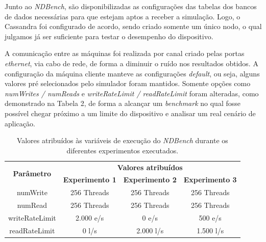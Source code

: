 \documentclass[12pt,english,brazil]{article}
\begin{document}
Junto ao \textit{NDBench}, são disponibilizadas as configurações das tabelas dos bancos de dados necessárias para que estejam aptos a receber a simulação. Logo, o Cassandra foi configurado de acordo, sendo criado somente um único nodo, o qual julgamos já ser suficiente para testar o desempenho do dispositivo.  

A comunicação entre as máquinas foi realizada por canal criado pelas portas \textit{ethernet}, via cabo de rede, de forma a diminuir o ruído nos resultados obtidos. A configuração da máquina cliente manteve as configurações \textit{default}, ou seja, alguns valores pré selecionados pelo simulador foram mantidos. Somente opções como \textit{numWrites / numReads} e \textit{writeRateLimit / readRateLimit} foram alteradas, como demonstrado na Tabela 2, de forma a alcançar um \textit{benchmark} no qual fosse possível chegar próximo a um limite do dispositivo e analisar um real cenário de aplicação.  

\begin{table}[!ht]
\centering
\caption{Valores atribuídos às variáveis de execução do \textit{NDBench} durante os diferentes experimentos executados.}
\begin{tabular}{c|ccc}
\multirow{2}{*}{\textbf{Parâmetro}} & \multicolumn{3}{c}{\textbf{Valores atribuídos}}                                                                    \\ \cline{2-4} 
                                    & \multicolumn{1}{c|}{\textbf{Experimento 1}} & \multicolumn{1}{c|}{\textbf{Experimento 2}} & \textbf{Experimento 3} \\ \hline
numWrite                            & \multicolumn{1}{c|}{256 Threads}            & \multicolumn{1}{c|}{256 Threads}            & 256 Threads            \\ \hline
numRead                             & \multicolumn{1}{c|}{256 Threads}            & \multicolumn{1}{c|}{256 Threads}            & 256 Threads            \\ \hline
writeRateLimit                      & \multicolumn{1}{c|}{2.000 e/s}              & \multicolumn{1}{c|}{0 e/s}                  & 500 e/s                \\ \hline
readRateLimit                       & \multicolumn{1}{c|}{0 l/s}                  & \multicolumn{1}{c|}{2.000 l/s}              & 1.500 l/s              \\ \hline
\end{tabular}
\end{table}
\end{document}

